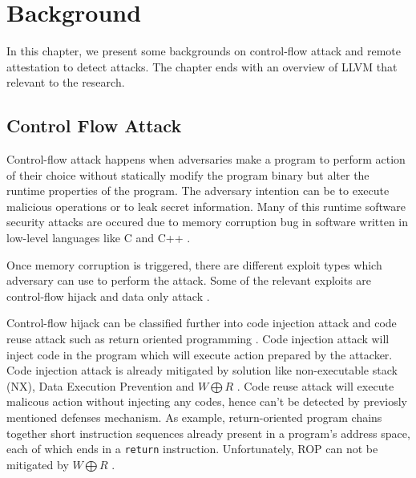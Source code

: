 
\chapter{Background} %

\label{Chapter3} %

In this chapter, we present some backgrounds on control-flow attack and remote attestation to detect attacks. The chapter ends with an overview of LLVM that relevant to the research. 

\section{Control Flow Attack}

Control-flow attack happens when adversaries make a program to perform action of their choice without statically modify the program binary but alter the runtime properties of the program. The adversary intention can be to execute malicious operations or to leak secret information. Many of this runtime software security attacks are occured due to memory corruption bug in software written in low-level languages like C and C++ \cite{szekeresSoKEternalWar2013}.

Once memory corruption is triggered, there are different exploit types which adversary can use to perform the attack. Some of the relevant exploits are control-flow hijack \cite{shachamGeometryInnocentFlesh2007, schusterCounterfeitObjectorientedProgramming2015}  and data only attack \cite{chenNonControlDataAttacksAre2005, carliniControlFlowBendingEffectiveness2015}. 

Control-flow hijack can be classified further into code injection attack and code reuse attack such as return oriented programming \cite{roemerReturnorientedProgrammingSystems2012}.  Code injection attack will inject code in the program which will execute action prepared by the attacker. Code injection attack is already mitigated by solution like non-executable stack (NX), Data Execution Prevention and \( W \bigoplus R \) \cite{vanderveenMemoryErrorsPresent2012}. Code reuse attack will execute malicous action without injecting any codes, hence can't be detected by previosly mentioned defenses mechanism. As example, return-oriented program chains together short instruction sequences already present in a program’s address space, each of which ends in a \texttt{return} instruction. Unfortunately, ROP can not be mitigated by \( W \bigoplus R \) \cite{roemerReturnorientedProgrammingSystems2012}.

